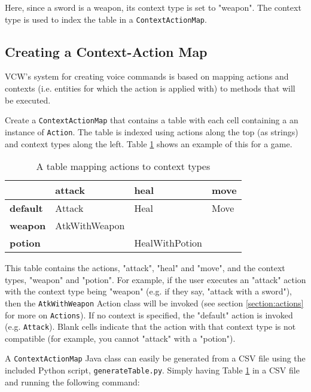 \documentclass{article}
\begin{document}
Here, since a sword is a weapon, its context type is set to "weapon". The context type is used to index the table in a \texttt{ContextActionMap}.

\subsection{Creating a Context-Action Map}
\label{section:context-action-map}

VCW's system for creating voice commands is based on mapping actions and contexts (i.e. entities for which the action is applied with) to methods that will be executed. 

Create a \texttt{ContextActionMap} that contains a table with each cell containing a an instance of \texttt{Action}. The table is indexed using actions along the top (as strings) and context types along the left. Table \ref{game-table} shows an example of this for a game.

\begin{table}[h]
\centering
\caption{A table mapping actions to context types}
\label{game-table}
\begin{tabular}{|l|l|l|l|}\hline
                 & \textbf{attack} & \textbf{heal} & \textbf{move} \\ \hline
\textbf{default} & Attack          & Heal          & Move          \\ \hline
\textbf{weapon}  & AtkWithWeapon       &               & \\ \hline
\textbf{potion}  &                 & HealWithPotion    & \\ \hline
\end{tabular}
\end{table}

This table contains the actions, "attack", "heal" and "move", and the context types, "weapon" and "potion". For example, if the user executes an "attack" action with the context type being "weapon" (e.g. if they say, "attack with a sword"), then the \texttt{AtkWithWeapon} Action class will be invoked (see section \ref{section:actions} for more on \texttt{Actions}). If no context is specified, the "default" action is invoked (e.g. \texttt{Attack}). Blank cells indicate that the action with that context type is not compatible (for example, you cannot "attack" with a "potion").

A \texttt{ContextActionMap} Java class can easily be generated from a CSV file using the included Python script, \texttt{generateTable.py}. Simply having Table \ref{game-table} in a CSV file and running the following command:
\end{document}

